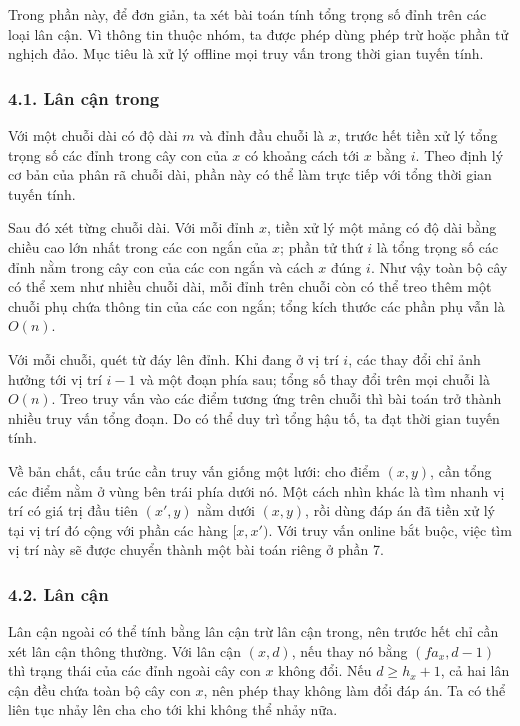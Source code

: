 \documentclass[11pt]{article}
\begin{document}
Trong phần này, để đơn giản, ta xét bài toán tính tổng trọng số đỉnh trên các
loại lân cận. Vì thông tin thuộc nhóm, ta được phép dùng phép trừ hoặc phần tử
nghịch đảo. Mục tiêu là xử lý offline mọi truy vấn trong thời gian tuyến tính.

\subsubsection*{4.1. Lân cận trong}

Với một chuỗi dài có độ dài \(m\) và đỉnh đầu chuỗi là \(x\), trước hết tiền xử
lý tổng trọng số các đỉnh trong cây con của \(x\) có khoảng cách tới \(x\) bằng
\(i\). Theo định lý cơ bản của phân rã chuỗi dài, phần này có thể làm trực tiếp
với tổng thời gian tuyến tính.

Sau đó xét từng chuỗi dài. Với mỗi đỉnh \(x\), tiền xử lý một mảng có độ dài
bằng chiều cao lớn nhất trong các con ngắn của \(x\); phần tử thứ \(i\) là tổng
trọng số các đỉnh nằm trong cây con của các con ngắn và cách \(x\) đúng \(i\).
Như vậy toàn bộ cây có thể xem như nhiều chuỗi dài, mỗi đỉnh trên chuỗi còn có
thể treo thêm một chuỗi phụ chứa thông tin của các con ngắn; tổng kích thước
các phần phụ vẫn là \(O(n)\).

Với mỗi chuỗi, quét từ đáy lên đỉnh. Khi đang ở vị trí \(i\), các thay đổi chỉ
ảnh hưởng tới vị trí \(i-1\) và một đoạn phía sau; tổng số thay đổi trên mọi
chuỗi là \(O(n)\). Treo truy vấn vào các điểm tương ứng trên chuỗi thì bài toán
trở thành nhiều truy vấn tổng đoạn. Do có thể duy trì tổng hậu tố, ta đạt thời
gian tuyến tính.

Về bản chất, cấu trúc cần truy vấn giống một lưới: cho điểm \((x,y)\), cần tổng
các điểm nằm ở vùng bên trái phía dưới nó. Một cách nhìn khác là tìm nhanh vị
trí có giá trị đầu tiên \((x',y)\) nằm dưới \((x,y)\), rồi dùng đáp án đã tiền
xử lý tại vị trí đó cộng với phần các hàng \([x,x')\). Với truy vấn online bắt
buộc, việc tìm vị trí này sẽ được chuyển thành một bài toán riêng ở phần 7.

\subsubsection*{4.2. Lân cận}

Lân cận ngoài có thể tính bằng lân cận trừ lân cận trong, nên trước hết chỉ
cần xét lân cận thông thường. Với lân cận \((x,d)\), nếu thay nó bằng
\((fa_x,d-1)\) thì trạng thái của các đỉnh ngoài cây con \(x\) không đổi. Nếu
\(d\ge h_x+1\), cả hai lân cận đều chứa toàn bộ cây con \(x\), nên phép thay
không làm đổi đáp án. Ta có thể liên tục nhảy lên cha cho tới khi không thể
nhảy nữa.
\end{document}
